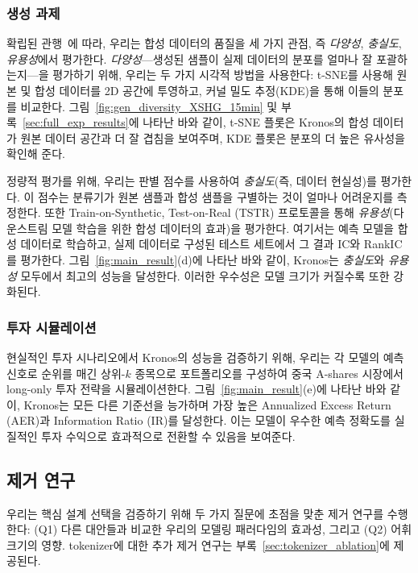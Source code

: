 \subsubsection{생성 과제}

확립된 관행~\cite{yoon2019time}에 따라, 우리는 합성 데이터의 품질을 세 가지 관점, 즉 \textit{다양성}, \textit{충실도}, \textit{유용성}에서 평가한다.
\textit{다양성}—생성된 샘플이 실제 데이터의 분포를 얼마나 잘 포괄하는지—을 평가하기 위해, 우리는 두 가지 시각적 방법을 사용한다: t-SNE를 사용해 원본 및 합성 데이터를 2D 공간에 투영하고, 커널 밀도 추정(KDE)을 통해 이들의 분포를 비교한다. 그림~\ref{fig:gen_diversity_XSHG_15min} 및 부록~\ref{sec:full_exp_results}에 나타난 바와 같이, t-SNE 플롯은 Kronos의 합성 데이터가 원본 데이터 공간과 더 잘 겹침을 보여주며, KDE 플롯은 분포의 더 높은 유사성을 확인해 준다.

정량적 평가를 위해, 우리는 판별 점수를 사용하여 \textit{충실도}(즉, 데이터 현실성)를 평가한다. 이 점수는 분류기가 원본 샘플과 합성 샘플을 구별하는 것이 얼마나 어려운지를 측정한다. 또한 Train-on-Synthetic, Test-on-Real (TSTR) 프로토콜을 통해 \textit{유용성}(다운스트림 모델 학습을 위한 합성 데이터의 효과)을 평가한다. 여기서는 예측 모델을 합성 데이터로 학습하고, 실제 데이터로 구성된 테스트 세트에서 그 결과 IC와 RankIC를 평가한다. 그림~\ref{fig:main_result}(d)에 나타난 바와 같이, Kronos는 \textit{충실도}와 \textit{유용성} 모두에서 최고의 성능을 달성한다. 이러한 우수성은 모델 크기가 커질수록 또한 강화된다.

\subsubsection{투자 시뮬레이션}
현실적인 투자 시나리오에서 Kronos의 성능을 검증하기 위해, 우리는 각 모델의 예측 신호로 순위를 매긴 상위-$k$ 종목으로 포트폴리오를 구성하여 중국 A-shares 시장에서 long-only 투자 전략을 시뮬레이션한다.
그림~\ref{fig:main_result}(e)에 나타난 바와 같이, Kronos는 모든 다른 기준선을 능가하며 가장 높은 Annualized Excess Return (AER)과 Information Ratio (IR)를 달성한다. 이는 모델이 우수한 예측 정확도를 실질적인 투자 수익으로 효과적으로 전환할 수 있음을 보여준다.

\subsection{제거 연구}

우리는 핵심 설계 선택을 검증하기 위해 두 가지 질문에 초점을 맞춘 제거 연구를 수행한다: (Q1) 다른 대안들과 비교한 우리의 모델링 패러다임의 효과성, 그리고 (Q2) 어휘 크기의 영향. tokenizer에 대한 추가 제거 연구는 부록~\ref{sec:tokenizer_ablation}에 제공된다.

